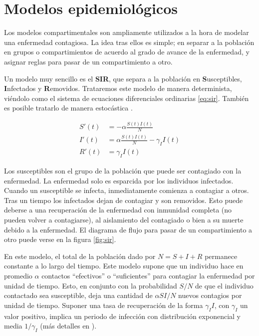 

\section{Modelos epidemiológicos}\label{sec:epi-model}

Los modelos compartimentales son ampliamente utilizados a la hora de modelar una enfermedad contagiosa. La idea tras ellos es simple; en separar a la población en grupos o compartimientos de acuerdo al grado de avance de la enfermedad, y asignar reglas para pasar de un compartimiento a otro.

Un modelo muy sencillo es el \textbf{SIR}, que separa a la población en \textbf{S}usceptibles, \textbf{I}nfectados y \textbf{R}emovidos. Trataremos este modelo de manera determinista, viéndolo como el sistema de ecuaciones diferenciales ordinarias \ref{eq:sir}. También es posible tratarlo de manera estocástica \cite{Daley1984}.

\begin{equation}
\label{eq:sir}
\begin{aligned}
S'(t) &=  -\alpha \frac{S(t)I(t)}{N} \\
I'(t) &= \alpha \frac{S(t)I(t)}{N}- \gamma_I I(t) \\
R'(t) &= \gamma_I I(t)
\end{aligned}
\end{equation}

Los susceptibles son el grupo de la población que puede ser contagiado con la enfermedad. La enfermedad solo es esparcida por los individuos infectados. Cuando un susceptible se infecta, inmediatamente comienza a contagiar a otros. Tras un tiempo los infectados dejan de contagiar y son removidos. Esto puede deberse a una recuperación de la enfermedad con inmunidad completa (no pueden volver a contagiarse), al aislamiento del contagiado o bien a su muerte debido a la enfermedad. El diagrama de flujo para pasar de un compartimiento a otro puede verse en la figura \ref{fig:sir}.

En este modelo, el total de la población dado por \(N = S + I + R\) permanece constante a lo largo del tiempo. Este modelo supone que un individuo hace en promedio \(\alpha\) contactos  ``efectivos'' o ``suficientes'' para contagiar la enfermedad por unidad de tiempo. Esto, en conjunto con la probabilidad \(S/N\) de que el individuo contactado sea susceptible, deja una cantidad de \(\alpha S I / N\) nuevos contagios por unidad de tiempo. Suponer una tasa de recuperación de la forma \(\gamma_I I\), con \(\gamma_I\) un valor positivo, implica un periodo de infección con distribución exponencial y media \(1/\gamma_I\) (más detalles en \cite{Brauer2019}).





